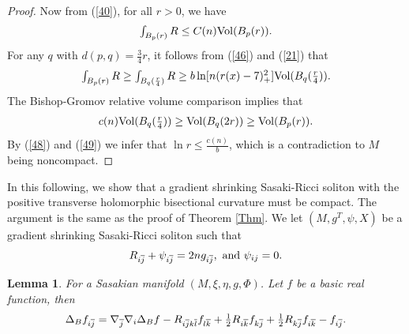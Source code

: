 \documentclass[12pt]{amsart}%
\newtheorem{lemma}{Lemma}
\numberwithin{equation}{section}
\begin{document}
\begin{proof}
Now from (\ref{40}), for all $r>0$, we have%
\[%
\begin{array}
[c]{c}%
\int_{B_{p}(r)}R\leq C(n)\mathrm{Vol}(B_{p}(r)).
\end{array}
\]
For any $q$ with $d(p,q)=\frac{3}{4}r$, it follows from (\ref{46}) and
(\ref{21}) that
\begin{equation}%
\begin{array}
[c]{c}%
\int_{B_{p}(r)}R\geq\int_{B_{q}(\frac{r}{4})}R\geq b\ln[n(r(x)-7)_{+}%
^{2}]\mathrm{Vol}(B_{q}(\frac{r}{4})).
\end{array}
\label{48}%
\end{equation}
The Bishop-Gromov relative volume comparison implies that%
\begin{equation}%
\begin{array}
[c]{c}%
c(n)\mathrm{Vol}(B_{q}(\frac{r}{4}))\geq\mathrm{Vol}(B_{q}(2r))\geq
\mathrm{Vol}(B_{p}(r)).
\end{array}
\label{49}%
\end{equation}
By (\ref{48}) and (\ref{49}) we infer that $\ln r\leq\frac{c(n)}{b}$, which is
a contradiction to $M$ being noncompact.
\end{proof}

In this following, we show that a gradient shrinking Sasaki-Ricci soliton with
the positive transverse holomorphic bisectional curvature must be compact. The
argument is the same as the proof of Theorem \ref{Thm}. We let $(M,g^{T}%
,\psi,X)$ be a gradient shrinking Sasaki-Ricci soliton such that
\begin{equation}%
\begin{array}
[c]{c}%
R_{i\overline{j}}+\psi_{i\overline{j}}=2ng_{i\overline{j}},\text{ \textrm{and}
}\psi_{ij}=0.
\end{array}
\label{2a}%
\end{equation}


\begin{lemma}
For a Sasakian manifold $(M,\xi,\eta,g,\Phi)$. Let $f$ be a basic real
function, then
\begin{equation}%
\begin{array}
[c]{c}%
\Delta_{B}f_{i\overline{j}}=\nabla_{\overline{j}}\nabla_{i}\Delta
_{B}f-R_{i\overline{j}k\overline{l}}f_{l\overline{k}}+\frac{1}{2}%
R_{i\overline{k}}f_{k\overline{j}}+\frac{1}{2}R_{k\overline{j}}f_{i\overline
{k}}-f_{i\overline{j}}.
\end{array}
\label{2}%
\end{equation}

\end{lemma}
\end{document}
